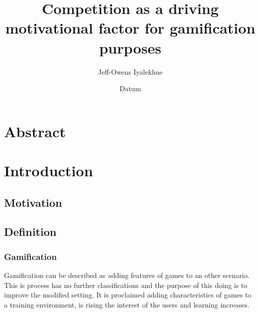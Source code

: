 %
% 
% 
%


\renewcommand{\Thema}{%
    Competition as a driving motivational factor for gamification purposes}




\title{\Thema}
\author{Jeff-Owens Iyalekhue}
\date{Datum}


\tableofcontents %

\chapter{Abstract}
\chapter{Introduction}

\section{Motivation}
\section{Definition}
\subsection{Gamification}
Gamification can be described as adding features of games to an other scenario. This is process has no further classifications and the purpose of this doing is to improve the modified setting. It is proclaimed adding characteristics of games to a training environment, is rising the interest of the users and learning increases.
